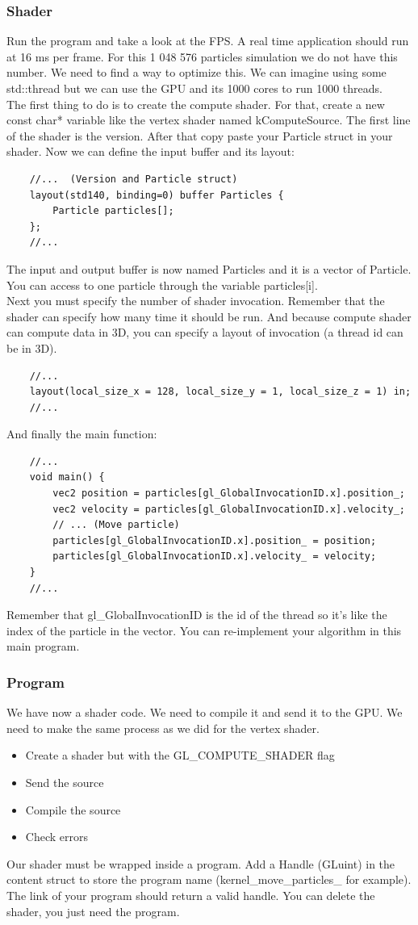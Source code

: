 \documentclass{article}
\begin{document}
\subsubsection{Shader}
Run the program and take a look at the FPS. A real time application should run at 16 ms per frame. For this 1 048 576 particles simulation we do not have this number. We need to find a way to optimize this. We can imagine using some std::thread but we can use the GPU and its 1000 cores to run 1000 threads.\\
The first thing to do is to create the compute shader. For that, create a new const char* variable like the vertex shader named kComputeSource. The first line of the shader is the version. After that copy paste your Particle struct in your shader. Now we can define the input buffer and its layout:
\begin{lstlisting}
	//...  (Version and Particle struct)
	layout(std140, binding=0) buffer Particles {
		Particle particles[];
	};
	//...
\end{lstlisting}
The input and output buffer is now named Particles and it is a vector of Particle. You can access to one particle through the variable particles[i].\\
Next you must specify the number of shader invocation. Remember that the shader can specify how many time it should be run. And because compute shader can compute data in 3D, you can specify a layout of invocation (a thread id can be in 3D).
\begin{lstlisting}
	//...
	layout(local_size_x = 128, local_size_y = 1, local_size_z = 1) in;
	//...
\end{lstlisting}
And finally the main function:
\begin{lstlisting}
	//...
	void main() {
		vec2 position = particles[gl_GlobalInvocationID.x].position_;
		vec2 velocity = particles[gl_GlobalInvocationID.x].velocity_;
		// ... (Move particle)
		particles[gl_GlobalInvocationID.x].position_ = position;
		particles[gl_GlobalInvocationID.x].velocity_ = velocity;
	}
	//...
\end{lstlisting}
Remember that gl\_GlobalInvocationID is the id of the thread so it's like the index of the particle in the vector.
You can re-implement your algorithm in this main program.
\subsubsection{Program}
We have now a shader code. We need to compile it and send it to the GPU. We need to make the same process as we did for the vertex shader.
\begin{itemize}
	\item Create a shader but with the GL\_COMPUTE\_SHADER flag
	\item Send the source
	\item Compile the source
	\item Check errors
\end{itemize}
Our shader must be wrapped inside a program. Add a Handle (GLuint) in the content struct to store the program name (kernel\_move\_particles\_ for example). The link of your program should return a valid handle. You can delete the shader, you just need the program.
\end{document}
